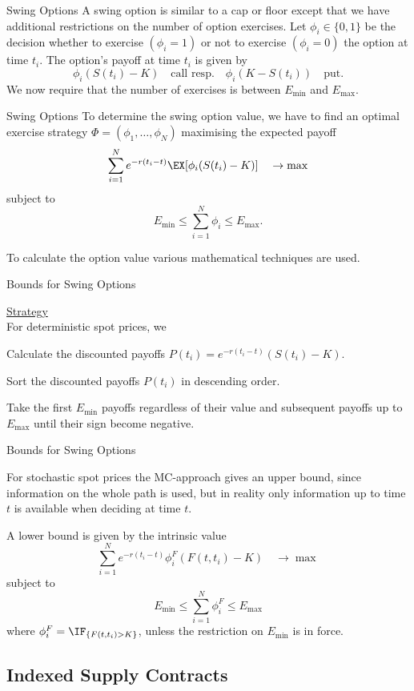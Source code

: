 {Swing Options}
A swing option is similar to a cap or floor except that we have
additional restrictions on the number of option exercises. Let
$\phi_i\in\{0,1\}$ be the decision whether to exercise
$(\phi_i=1)$ or not to exercise $(\phi_i=0)$ the option at time
$t_i$. The option's payoff at time $t_i$ is given by
$$\phi_i(S(t_i)-K)\quad\mbox{call resp.}\quad\phi_i(K-S(t_i))\quad\mbox{put}.$$
We now require that the number of exercises is between $E_{\min}$
and $E_{\max}$.

{Swing Options}
To determine the swing option value, we have to find an optimal exercise
strategy $\Phi=(\phi_1,\ldots,\phi_N)$ maximising the expected
payoff
$$\sum_{i=1}^Ne^{-r(t_i-t)}\EX[{\phi_i(S(t_i)-K)}]\quad\rightarrow\max$$
subject to $$E_{\min}\leq\sum_{i=1}^N\phi_i\leq E_{\max}.$$

To calculate the option value various mathematical techniques are used.

{Bounds for Swing Options}

\underline{Strategy}\\
For deterministic spot prices, we






	Calculate the discounted payoffs
  $P(t_i)=e^{-r(t_i-t)}(S(t_i)-K)$.


	Sort the discounted payoffs $P(t_i)$ in descending order.


	Take the first $E_{\min}$ payoffs regardless of their
  value and subsequent payoffs up to $E_{\max}$ until their sign
  become negative.





{Bounds for Swing Options}

For stochastic spot prices the MC-approach gives an upper bound,
since information on the whole path is used, but in reality only
information up to time $t$ is available when deciding at time $t$.

A lower bound is given by the intrinsic value
$$\sum_{i=1}^Ne^{-r(t_i-t)} \phi_i^F (F(t,t_i)-K) \quad\rightarrow\max$$
subject to $$E_{\min}\leq\sum_{i=1}^N\phi^F_i\leq E_{\max}$$
where $\phi_i^F=\IF_{\{F(t,t_i)>K\}}$, unless the restriction on $E_{\min}$ is in force.

\subsection{Indexed Supply Contracts}

